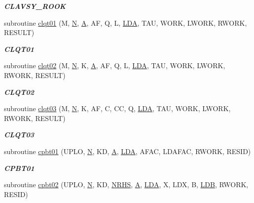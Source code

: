 \begin{DoxyCompactItemize}
\begin{DoxyCompactList}\small\item\em {\bfseries C\+L\+A\+V\+S\+Y\+\_\+\+R\+O\+O\+K} \end{DoxyCompactList}\item 
subroutine \hyperlink{group__complex__lin_gad503d64aa2a6480927e30cbc66d5192a}{clqt01} (M, \hyperlink{polmisc_8c_a0240ac851181b84ac374872dc5434ee4}{N}, \hyperlink{classA}{A}, A\+F, Q, L, \hyperlink{example__user_8c_ae946da542ce0db94dced19b2ecefd1aa}{L\+D\+A}, T\+A\+U, W\+O\+R\+K, L\+W\+O\+R\+K, R\+W\+O\+R\+K, R\+E\+S\+U\+L\+T)
\begin{DoxyCompactList}\small\item\em {\bfseries C\+L\+Q\+T01} \end{DoxyCompactList}\item 
subroutine \hyperlink{group__complex__lin_ga51159190e05633c4ab1b81ccfbdb6597}{clqt02} (M, \hyperlink{polmisc_8c_a0240ac851181b84ac374872dc5434ee4}{N}, K, \hyperlink{classA}{A}, A\+F, Q, L, \hyperlink{example__user_8c_ae946da542ce0db94dced19b2ecefd1aa}{L\+D\+A}, T\+A\+U, W\+O\+R\+K, L\+W\+O\+R\+K, R\+W\+O\+R\+K, R\+E\+S\+U\+L\+T)
\begin{DoxyCompactList}\small\item\em {\bfseries C\+L\+Q\+T02} \end{DoxyCompactList}\item 
subroutine \hyperlink{group__complex__lin_ga6ee69fa18a7c0ee24ef337fe04defdf1}{clqt03} (M, \hyperlink{polmisc_8c_a0240ac851181b84ac374872dc5434ee4}{N}, K, A\+F, C, C\+C, Q, \hyperlink{example__user_8c_ae946da542ce0db94dced19b2ecefd1aa}{L\+D\+A}, T\+A\+U, W\+O\+R\+K, L\+W\+O\+R\+K, R\+W\+O\+R\+K, R\+E\+S\+U\+L\+T)
\begin{DoxyCompactList}\small\item\em {\bfseries C\+L\+Q\+T03} \end{DoxyCompactList}\item 
subroutine \hyperlink{group__complex__lin_gaa99cc86b7fce9a9c696e608513bbc691}{cpbt01} (U\+P\+L\+O, \hyperlink{polmisc_8c_a0240ac851181b84ac374872dc5434ee4}{N}, K\+D, \hyperlink{classA}{A}, \hyperlink{example__user_8c_ae946da542ce0db94dced19b2ecefd1aa}{L\+D\+A}, A\+F\+A\+C, L\+D\+A\+F\+A\+C, R\+W\+O\+R\+K, R\+E\+S\+I\+D)
\begin{DoxyCompactList}\small\item\em {\bfseries C\+P\+B\+T01} \end{DoxyCompactList}\item 
subroutine \hyperlink{group__complex__lin_ga5965ebaab396449b7894e4ca75d05c05}{cpbt02} (U\+P\+L\+O, \hyperlink{polmisc_8c_a0240ac851181b84ac374872dc5434ee4}{N}, K\+D, \hyperlink{example__user_8c_aa0138da002ce2a90360df2f521eb3198}{N\+R\+H\+S}, \hyperlink{classA}{A}, \hyperlink{example__user_8c_ae946da542ce0db94dced19b2ecefd1aa}{L\+D\+A}, X, L\+D\+X, B, \hyperlink{example__user_8c_a50e90a7104df172b5a89a06c47fcca04}{L\+D\+B}, R\+W\+O\+R\+K, R\+E\+S\+I\+D)

\end{DoxyCompactItemize}
